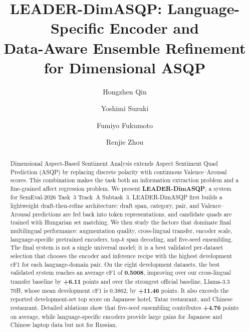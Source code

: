 \documentclass[runningheads]{llncs}
\begin{document}
\title{\texorpdfstring{LEADER-DimASQP: Language-Specific Encoder and\\
Data-Aware Ensemble Refinement for Dimensional ASQP}{LEADER-DimASQP: Language-Specific Encoder and Data-Aware Ensemble Refinement for Dimensional ASQP}}

\author{Hongzhen Qin \and Yoshimi Suzuki \and
Fumiyo Fukumoto \and Renjie Zhou}

\maketitle

\begin{abstract}
Dimensional Aspect-Based Sentiment Analysis extends Aspect Sentiment
Quad Prediction (ASQP) by replacing discrete polarity with continuous
Valence--Arousal scores. This combination makes the task both an information
extraction problem and a fine-grained affect regression problem. We
present \textbf{LEADER-DimASQP}, a system for SemEval-2026 Task~3
Track~A Subtask~3. LEADER-DimASQP first builds a lightweight
draft-then-refine architecture: draft span, category, pair, and
Valence--Arousal predictions are fed back into token representations,
and candidate quads are trained with Hungarian set matching. We then
study the factors that dominate final multilingual performance:
augmentation quality, cross-lingual transfer, encoder scale,
language-specific pretrained encoders, top-$k$ span decoding, and
five-seed ensembling. The final system is not a single universal
model; it is a best validated per-dataset selection that chooses the
encoder and inference recipe with the highest development cF1 for each
language-domain pair. On the eight development datasets, the best
validated system reaches an average cF1 of \textbf{0.5008}, improving
over our cross-lingual transfer baseline by \textbf{+6.11} points and
over the strongest official baseline, Llama-3.3 70B, whose mean
development cF1 is 0.3862, by \textbf{+11.46} points.
It also exceeds the reported development-set top score on Japanese
hotel, Tatar restaurant, and Chinese restaurant. Detailed ablations
show that five-seed ensembling contributes \textbf{+4.76} points on
average, while language-specific encoders provide large gains for
Japanese and Chinese laptop data but not for Russian.

\end{abstract}
\end{document}
